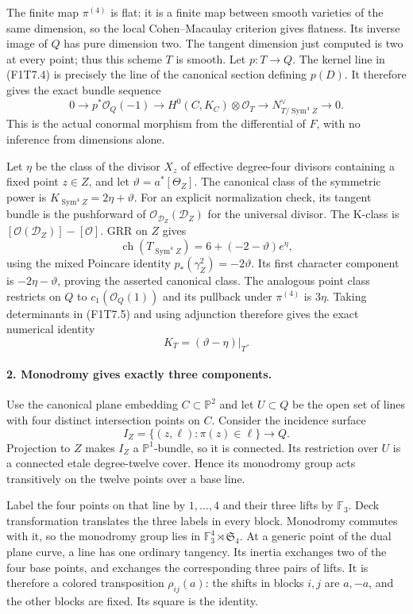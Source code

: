 The finite map $\pi^{(4)}$ is flat: it is a finite map between
smooth varieties of the same dimension, so the local
Cohen--Macaulay criterion gives flatness. Its inverse image
of $Q$ has pure dimension two. The tangent dimension just
computed is two at every point; thus this scheme $T$ is smooth.
Let $p:T\to Q$. The kernel line in (F1T7.4) is precisely the
line of the canonical section defining $p(D)$. It therefore
gives the exact bundle sequence
\[
 0\longrightarrow p^*\mathcal O_Q(-1)
  \longrightarrow H^0(C,K_C)\otimes\mathcal O_T
  \longrightarrow N^\vee_{T/\operatorname{Sym}^4Z}
  \longrightarrow0.
 \tag{F1T7.5}
\]
This is the actual conormal morphism from the differential of
$F$, with no inference from dimensions alone.

Let $\eta$ be the class of the divisor $X_z$ of effective
degree-four divisors containing a fixed point $z\in Z$, and let
$\vartheta=a^*[\Theta_Z]$. The canonical class of the symmetric
power is $K_{\operatorname{Sym}^4Z}=2\eta+\vartheta$.
For an explicit normalization check, its tangent bundle is
the pushforward of $\mathcal O_{\mathcal D_Z}(\mathcal D_Z)$
for the universal divisor. The K-class is
$[\mathcal O(\mathcal D_Z)]-[\mathcal O]$. GRR on $Z$ gives
\[
 \operatorname{ch}(T_{\operatorname{Sym}^4Z})
           =6+(-2-\vartheta)e^\eta,
\]
using the mixed Poincare identity
$p_*(\gamma_Z^2)=-2\vartheta$. Its first character component
is $-2\eta-\vartheta$, proving the asserted canonical class.
The analogous point class restricts on $Q$ to
$c_1(\mathcal O_Q(1))$ and its pullback under $\pi^{(4)}$ is
$3\eta$. Taking determinants in (F1T7.5) and using adjunction
therefore gives the exact numerical identity
\[
                         K_T=(\vartheta-\eta)|_T.
 \tag{F1T7.6}
\]

\paragraph{2. Monodromy gives exactly three components.}
Use the canonical plane embedding $C\subset\mathbb P^2$ and
let $U\subset Q$ be the open set of lines with four distinct
intersection points on $C$. Consider the incidence surface
\[
 I_Z=\{(z,\ell):\pi(z)\in\ell\}
                 \longrightarrow Q.
\]
Projection to $Z$ makes $I_Z$ a $\mathbb P^1$-bundle, so it is
connected. Its restriction over $U$ is a connected etale
degree-twelve cover. Hence its monodromy group acts
transitively on the twelve points over a base line.

Label the four points on that line by $1,\ldots,4$ and their
three lifts by $\mathbb F_3$. Deck transformation translates
the three labels in every block. Monodromy commutes with it,
so the monodromy group lies in
$\mathbb F_3^4\rtimes\mathfrak S_4$.
At a generic point of the dual plane curve, a line has one
ordinary tangency. Its inertia exchanges two of the four
base points, and exchanges the corresponding three pairs
of lifts. It is therefore a colored transposition
$\rho_{ij}(a)$: the shifts in blocks $i,j$ are $a,-a$, and
the other blocks are fixed. Its square is the identity.

